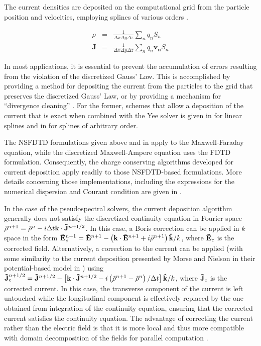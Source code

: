 

The current densities are deposited on the computational grid from
the particle position and velocities, employing splines of various
orders \cite{AbeJCP86}.

\begin{subequations}
\begin{eqnarray}
\rho & = & \frac{1}{\Delta x \Delta y \Delta z}\sum_nq_nS_n\\
\mathbf{J} & = & \frac{1}{\Delta x \Delta y \Delta z}\sum_nq_n\mathbf{v_n}S_n
\end{eqnarray}
\end{subequations}

In most applications, it is essential to prevent the accumulation
of errors resulting from the violation of the discretized Gauss' Law.
This is accomplished by providing a method for depositing the current
from the particles to the grid that preserves the discretized Gauss'
Law, or by providing a mechanism for ``divergence cleaning'' \cite{BirdsallLangdon,LangdonCPC92,MarderJCP87,VayPOP98,Munzjcp2000}.
For the former, schemes that allow a deposition of the current that
is exact when combined with the Yee solver is given in \cite{VillasenorCPC92}
for linear splines and in \cite{Esirkepovcpc01} for splines of arbitrary order. 

The NSFDTD formulations given above and in \cite{PukhovJPP99,VayJCP2011,CowanPRSTAB13,LehePRSTAB13} 
apply to the Maxwell-Faraday
equation, while the discretized Maxwell-Ampere equation uses the FDTD
formulation. Consequently, the charge conserving algorithms developed
for current deposition \cite{VillasenorCPC92,Esirkepovcpc01} apply
readily to those NSFDTD-based formulations. More details concerning
those implementations, including the expressions for the numerical
dispersion and Courant condition are given 
in \cite{PukhovJPP99,VayJCP2011,CowanPRSTAB13,LehePRSTAB13}. 

In the case of the pseudospectral solvers, the current deposition
algorithm generally does not satisfy the discretized continuity equation
in Fourier space $\tilde{\rho}^{n+1}=\tilde{\rho}^{n}-i\Delta t\mathbf{k}\cdot\mathbf{\tilde{J}}^{n+1/2}$.
In this case, a Boris correction \cite{BirdsallLangdon} can be applied
in $k$ space in the form $\mathbf{\tilde{E}}_{c}^{n+1}=\mathbf{\tilde{E}}^{n+1}-\left(\mathbf{k}\cdot\mathbf{\tilde{E}}^{n+1}+i\tilde{\rho}^{n+1}\right)\mathbf{\hat{k}}/k$,
where $\mathbf{\tilde{E}}_{c}$ is the corrected field. Alternatively, a correction
to the current can be applied (with some similarity to the current
deposition presented by Morse and Nielson in their potential-based
model in \cite{MorseNielson1971}) using $\mathbf{\tilde{J}}_{c}^{n+1/2}=\mathbf{\tilde{J}}^{n+1/2}-\left[\mathbf{k}\cdot\mathbf{\tilde{J}}^{n+1/2}-i\left(\tilde{\rho}^{n+1}-\tilde{\rho}^{n}\right)/\Delta t\right]\mathbf{\hat{k}}/k$,
where $\mathbf{\tilde{J}}_{c}$ is the corrected current. In this case, the transverse
component of the current is left untouched while the longitudinal
component is effectively replaced by the one obtained from integration
of the continuity equation, ensuring that the corrected current satisfies
the continuity equation. The advantage of correcting the current rather than 
the electric field is that it is more local and thus more compatible with 
domain decomposition of the fields for parallel computation \cite{VayJCP2013}.

